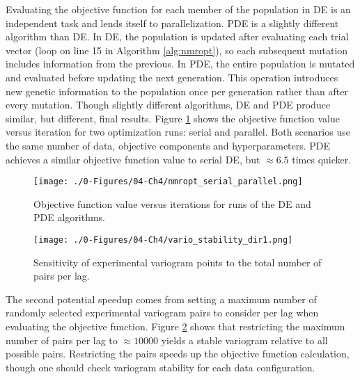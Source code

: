 Evaluating the objective function for each member of the population in \gls{DE} is an independent task and lends itself to parallelization. \gls{PDE} is a slightly different algorithm than \gls{DE}. In \gls{DE}, the population is updated after evaluating each trial vector (loop on line 15 in Algorithm \ref{alg:nmropt}), so each subsequent mutation includes information from the previous. In \gls{PDE}, the entire population is mutated and evaluated before updating the next generation. This operation introduces new genetic information to the population once per generation rather than after every mutation. Though slightly different algorithms, \gls{DE} and \gls{PDE} produce similar, but different, final results. Figure \ref{fig:nmropt_serial_parallel} shows the objective function value versus iteration for two optimization runs: serial and parallel. Both scenarios use the same number of data, objective components and hyperparameters. \Gls{PDE} achieves a similar objective function value to serial \gls{DE}, but $\approx 6.5$ times quicker.

\begin{figure}[htb!]
    \centering
    \texttt{[image: ./0-Figures/04-Ch4/nmropt\_serial\_parallel.png]}
    \caption{Objective function value versus iterations for runs of the \gls{DE} and \gls{PDE} algorithms.}
    \label{fig:nmropt_serial_parallel}
\end{figure}

\begin{figure}[htb!]
    \centering
    \texttt{[image: ./0-Figures/04-Ch4/vario\_stability\_dir1.png]}
    \caption{Sensitivity of experimental variogram points to the total number of pairs per lag.}
    \label{fig:vario_stability_dir1}
\end{figure}

The second potential speedup comes from setting a maximum number of randomly selected experimental variogram pairs to consider per lag when evaluating the objective function. Figure \ref{fig:vario_stability_dir1} shows that restricting the maximum number of pairs per lag to $\approx 10000$ yields a stable variogram relative to all possible pairs. Restricting the pairs speeds up the objective function calculation, though one should check variogram stability for each data configuration.


